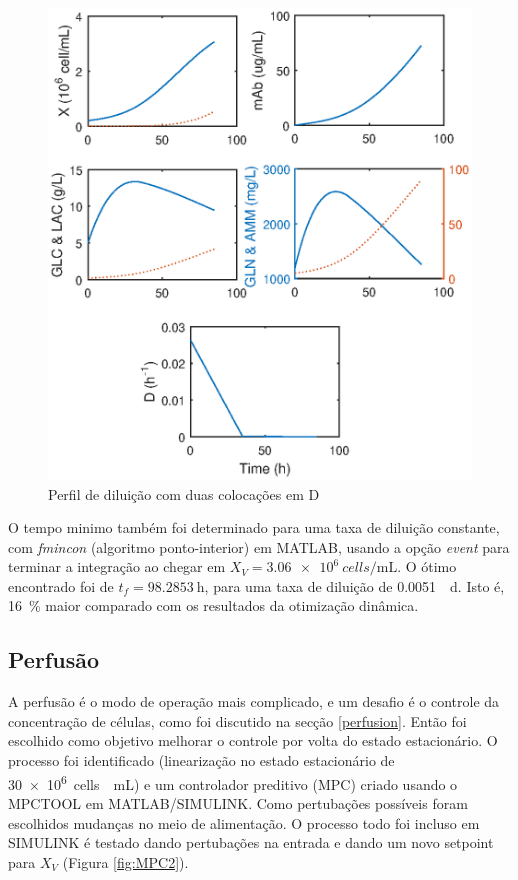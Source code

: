 \documentclass[fleqn,10pt]{SelfArx} %
\begin{document}
\begin{figure}[ht]\centering
	\includegraphics[width=\linewidth]{model3_ncolu2}
	\caption{Perfil de diluição com duas colocações em D}
	\label{fig:model3_ncolu2}
\end{figure}

O tempo minimo também foi determinado para uma taxa de diluição constante, com  \textit{fmincon} (algoritmo ponto-interior) em MATLAB, usando a opção \textit{event} para terminar a integração ao chegar em $X_V = \SI{3.06e6}{cells \per\mL}$. O ótimo encontrado foi de $t_{f} = \SI{98,2853}{\hour}$, para uma taxa de diluição de \SI{0.0051}{\per\day}.
Isto é, \SI{16}{\%} maior comparado com os resultados da otimização dinâmica. 
\subsection{Perfusão}

A perfusão é o modo de operação mais complicado, e um desafio é o controle da concentração de células, como foi discutido na secção \ref{perfusion}. Então foi escolhido como objetivo melhorar o controle por volta do estado estacionário. O processo foi identificado (linearização no estado estacionário de \SI{30e6}{cells \per\mL}) e um controlador preditivo (MPC) criado usando o MPCTOOL em MATLAB/SIMULINK. Como pertubações possíveis foram escolhidos mudanças no meio de alimentação. O processo todo foi incluso em SIMULINK é testado dando pertubações na entrada e dando um novo setpoint para $X_V$ (Figura \ref{fig:MPC2}). 
\end{document}
